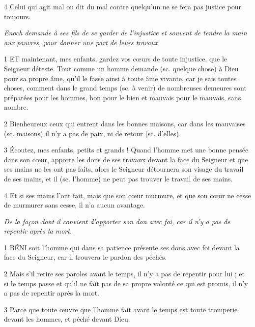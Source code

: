 \par 4 Celui qui agit mal ou dit du mal contre quelqu'un ne se fera pas justice pour toujours.


\par \textit{Enoch demande à ses fils de se garder de l'injustice et souvent de tendre la main aux pauvres, pour donner une part de leurs travaux.}

\par 1 ET maintenant, mes enfants, gardez vos cœurs de toute injustice, que le Seigneur déteste. Tout comme un homme demande (sc. quelque chose) à Dieu pour sa propre âme, qu'il le fasse ainsi à toute âme vivante, car je sais toutes choses, comment dans le grand temps (sc. à venir) de nombreuses demeures sont préparées pour les hommes, bon pour le bien et mauvais pour le mauvais, sans nombre.

\par 2 Bienheureux ceux qui entrent dans les bonnes maisons, car dans les mauvaises (sc. maisons) il n'y a pas de paix, ni de retour (sc. d'elles).

\par 3 Écoutez, mes enfants, petits et grands ! Quand l'homme met une bonne pensée dans son cœur, apporte les dons de ses travaux devant la face du Seigneur et que ses mains ne les ont pas faits, alors le Seigneur détournera son visage du travail de ses mains, et il (sc. l'homme) ne peut pas trouver le travail de ses mains.

\par 4 Et si ses mains l'ont fait, mais que son cœur murmure, et que son cœur ne cesse de murmurer sans cesse, il n'a aucun avantage.


\par \textit{De la façon dont il convient d'apporter son don avec foi, car il n'y a pas de repentir après la mort.}

\par 1 BÉNI soit l'homme qui dans sa patience présente ses dons avec foi devant la face du Seigneur, car il trouvera le pardon des péchés.

\par 2 Mais s'il retire ses paroles avant le temps, il n'y a pas de repentir pour lui ; et si le temps passe et qu'il ne fait pas de sa propre volonté ce qui est promis, il n'y a pas de repentir après la mort.

\par 3 Parce que toute œuvre que l'homme fait avant le temps est toute tromperie devant les hommes, et péché devant Dieu.



